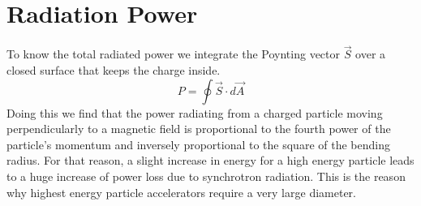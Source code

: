 
\section{Radiation Power}
To know the total radiated power we integrate the Poynting vector $\vec{S}$ over a closed surface that keeps the charge inside. 
\begin{equation}
\label{eq:24}
P=\oint \vec{S}\cdot d\vec{A} 
\end{equation}
Doing this we find that the power radiating from a charged particle moving perpendicularly to a magnetic field is proportional to the fourth power of the particle's momentum and inversely proportional to the square of the bending radius\citep{libro}. For that reason, a slight increase in energy for a high energy particle leads to a huge increase of power loss due to synchrotron radiation. This is the reason why highest energy particle accelerators require a very large diameter.




